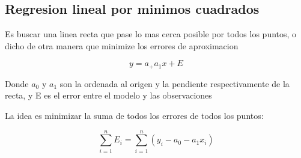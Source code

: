 \documentclass[10pt]{article}
\begin{document}
\subsection{Regresion lineal por minimos cuadrados}

Es buscar una linea recta que pase lo mas cerca posible por todos los puntos, 
o dicho de otra manera que minimize los errores de aproximacion

\begin{equation}
	y = a_ + a_1x + E
\end{equation}

Donde $a_0$ y $a_1$ son la ordenada al origen y la pendiente respectivamente de la recta, 
y E es el error entre el modelo y las observaciones

La idea es minimizar la suma de todos los errores de todos los puntos:

\begin{equation}
	\sum_{i=1}^n E_i = \sum_{i=1}^n (y_i-a_0 - a_1x_i)
\end{equation}
\end{document}
